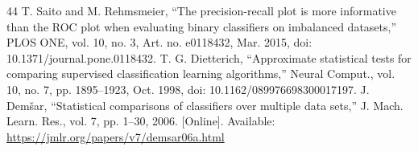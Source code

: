\begin{thebibliography}{44}
 T. Saito and M. Rehmsmeier, ``The precision-recall plot is more informative than the ROC plot when evaluating binary classifiers on imbalanced datasets,'' PLOS ONE, vol. 10, no. 3, Art. no. e0118432, Mar. 2015, doi: \mbox{10.1371/journal.pone.0118432}.
 T. G. Dietterich, ``Approximate statistical tests for comparing supervised classification learning algorithms,'' Neural Comput., vol. 10, no. 7, pp. 1895--1923, Oct. 1998, doi: \mbox{10.1162/089976698300017197}.
 J. Demšar, ``Statistical comparisons of classifiers over multiple data sets,'' J. Mach. Learn. Res., vol. 7, pp. 1--30, 2006. [Online]. Available: \url{https://jmlr.org/papers/v7/demsar06a.html}
\end{thebibliography}

